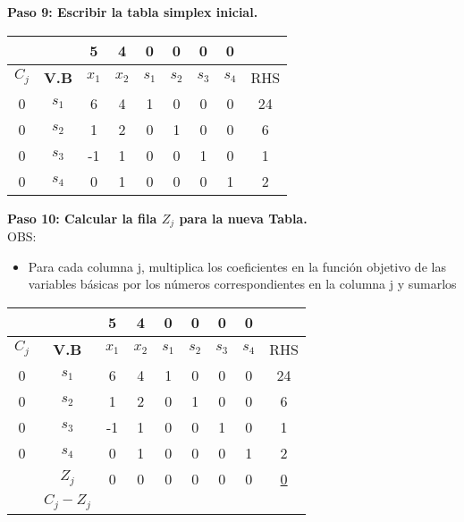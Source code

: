 \documentclass{templateNote}
\begin{document}
\newpage
\noindent
\textbf{Paso 9: Escribir la tabla simplex inicial.}
\begin{center}
    \begin{tabular}{|c|c|c|c|c|c|c|c|c|}
        \hline
        & & 5 & 4 & 0 & 0 & 0 & 0 & \\ \hline
        $C_j$ & \textbf{V.B} & $x_1$ & $x_2$ & $s_1$ & $s_2$ & $s_3$ & $s_4$ & RHS \\ \hline
        0 & $s_1$ & 6 & 4 & 1 & 0 & 0 & 0 & 24 \\ \hline
        0 & $s_2$ & 1 & 2 & 0 & 1 & 0 & 0 & 6 \\ \hline
        0 & $s_3$ & -1 & 1 & 0 & 0 & 1 & 0 & 1 \\ \hline
        0 & $s_4$ & 0 & 1 & 0 & 0 & 0 & 1 & 2 \\ \hline
    \end{tabular}
\end{center}
\textbf{Paso 10: Calcular la fila $Z_j$ para la nueva Tabla.}
\\
OBS:
\begin{itemize}
    \item Para cada columna j, multiplica los coeficientes en la función objetivo de las variables básicas por los números correspondientes en la columna j y sumarlos
\end{itemize}
\begin{center}
    \begin{tabular}{|c|c|c|c|c|c|c|c|c|}
        \hline
        & & 5 & 4 & 0 & 0 & 0 & 0 & \\ \hline
        $C_j$ & \textbf{V.B} & $x_1$ & $x_2$ & $s_1$ & $s_2$ & $s_3$ & $s_4$ & RHS \\ \hline
        \cellcolor{green!50}0 & $s_1$ & \cellcolor{green!50}6 & 4 & 1 & 0 & 0 & 0 & 24 \\ \hline
        \cellcolor{blue!50}0 & $s_2$ & \cellcolor{blue!50}1 & 2 & 0 & 1 & 0 & 0 & 6 \\ \hline
        \cellcolor{orange!50}0 & $s_3$ & \cellcolor{orange!50}-1 & 1 & 0 & 0 & 1 & 0 & 1 \\ \hline
        \cellcolor{yellow!50}0 & $s_4$ & \cellcolor{yellow!50}0 & 1 & 0 & 0 & 0 & 1 & 2 \\ \hline
        & $Z_j$ & \cellcolor{red!50}0 & 0 & 0 & 0 & 0 & 0 & \underline{0} \\ \hline
        & $C_j - Z_j$ & & & & & & & \\ \hline
    \end{tabular}
\end{center}
\end{document}
